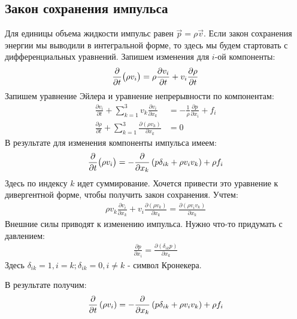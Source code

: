 \subsection{Закон сохранения импульса}
Для единицы объема жидкости импульс равен $ \vec { p } = \rho \vec{v} $. Если закон сохранения энергии мы выводили в интегральной форме, то здесь мы будем стартовать с дифференциальных уравнений. Запишем изменения для $i$-ой компоненты:
\begin{align*}
\pdv{t} \big( \rho v _ { i } \big) = \rho \frac { \partial v _ { i } } { \partial t } + v _ { i } \frac { \partial \rho } { \partial t }
\end{align*}
Запишем уравнение Эйлера и уравнение непрерывности по компонентам:
\begin{align*}
\frac { \partial v _ { i } } { \partial t } + \sum _ { k = 1 } ^ { 3 } v _ { k } \frac { \partial v _ { i } } { \partial x_k } &= - \frac { 1 } { \rho } \frac { \partial p } { \partial x _ { i } } + f _ { i } \\
\frac { \partial \rho } { \partial t } + \sum _ { k = 1 } ^ { 3 } \frac { \partial \left( \rho v _ { k } \right) } { \partial x _ { k } } &= 0
\end{align*}
В результате для изменения компоненты импульса имеем:
\begin{align*}
\pdv{t} \big( \rho v _ { i } \big) = - \frac { \partial } { \partial x _ { k } } \left( p \delta _ { i k } + \rho v _ { i } v _ { k } \right) + \rho f _ { i }
\end{align*}
Здесь по индексу $k$ идет суммирование. Хочется привести это уравнение к дивергентной форме, чтобы получить закон сохранения. Учтем:
\begin{align*}
\rho v _ { k } \frac { \partial v _ { i } } { \partial x _ { k } } + v _ { i } \frac { \partial \left( \rho v _ { k } \right) } { \partial x _ { k } } = \frac { \partial \left( \rho v _ { i } v _ { k } \right) } { \partial x _ { k } }
\end{align*}
Внешние силы приводят к изменению импульса. Нужно что-то придумать с давлением:
\begin{align*}
\frac { \partial p } { \partial x _ { i } } = \frac { \partial \left( \delta _ { i k } p \right) } { \partial x _ { k } }
\end{align*}
Здесь $ \delta _ { i k } = 1 , i = k ; \delta _ { i k } = 0 , i \neq k $ - символ Кронекера.

В результате получим:
\begin{align*}
\pdv{t} \left( \rho v _ { i } \right) = - \frac { \partial } { \partial x _ { k } } \left( p \delta _ { i k } + \rho v _ { i } v _ { k } \right) + \rho f _ { i }
\end{align*}

